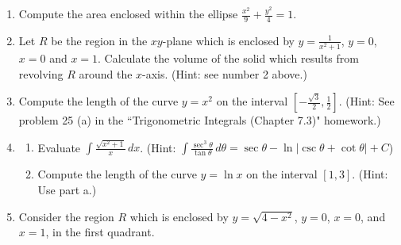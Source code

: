 \documentclass[12pt]{article}
\newif\ifans
\begin{document}
\begin{enumerate}
\ifans{\fbox{$\sin^{-1}(x-2)+C$}} \fi

\item Compute the area enclosed within the ellipse $\frac{x^2}{9}+\frac{y^2}{4}=1$.

\ifans{\fbox{$6\pi$}} \fi

\item Let $R$ be the region in the $xy$-plane which is enclosed by $y=\frac{1}{x^2+1}$, $y=0$, $x=0$ and $x=1$.  Calculate the volume of the solid which results from revolving $R$ around the $x$-axis.  (Hint: see number 2 above.)

\ifans{\fbox{$\frac{\pi}{4}\left(\frac{\pi}{2}+1\right)$}} \fi

\item Compute the length of the curve $y=x^2$ on the interval $\left[-\frac{\sqrt{3}}{2},\frac{1}{2}\right]$.  (Hint: See problem 25 (a) in the ``Trigonometric Integrals (Chapter 7.3)" homework.)

\ifans{\fbox{$\frac{\sqrt{2}}{4}+\frac{1}{4}\ln{\left|\sqrt{2}+1\right|}+\frac{\sqrt{3}}{2}-\frac{1}{4}\ln{\left|2-\sqrt{3}\right|}$}} \fi

\item \begin{enumerate}

\item Evaluate $\int \frac{\sqrt{x^2+1}}{x} \,dx$.  (Hint: $\int \frac{\sec^3{\theta}}{\tan{\theta}} \,d\theta = \sec{\theta}-\ln{|\csc{\theta}+\cot{\theta}|}+C$)

\ifans{\fbox{$\sqrt{x^2+1}-\ln{\left|\frac{\sqrt{x^2+1}+1}{x}\right|}+C$}} \fi

\item Compute the length of the curve $y=\ln{x}$ on the interval $[1,3]$.  (Hint: Use part a.)

\ifans{\fbox{$\sqrt{10}-\ln{\left(\frac{\sqrt{10}+1}{3}\right)}-\sqrt{2}+\ln{\left(\sqrt{2}+1\right)}$}} \fi

\end{enumerate}

\item Consider the region $R$ which is enclosed by $y=\sqrt{4-x^2}$, $y=0$, $x=0$, and $x=1$, in the first quadrant.


\end{enumerate}
\end{document}
